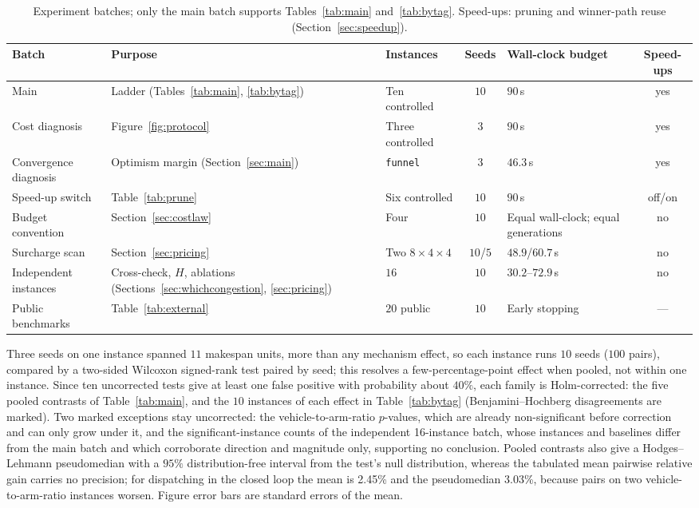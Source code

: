 \documentclass[manuscript,screen,review]{acmart}
\newcommand{\NCases}{10}
\newcommand{\NSeeds}{10}
\newcommand{\NPairs}{100}
\newcommand{\GainProbeLoop}{2.45\%}      %
\newcommand{\HLProbeLoop}{3.03\%}
\newcommand{\MatrixCells}{16}
\newcommand{\PubNInst}{20}
\begin{document}
\begin{table}[t]
\caption{Experiment batches; only the main batch supports Tables~\ref{tab:main} and~\ref{tab:bytag}. Speed-ups: pruning and winner-path reuse (Section~\ref{sec:speedup}).}
\label{tab:batches}
\footnotesize
\begin{tabular}{@{}p{1.7cm}p{2.3cm}p{1.9cm}cp{1.6cm}c@{}}
\toprule
Batch & Purpose & Instances & Seeds & Wall-clock budget & Speed-ups \\
\midrule
Main & Ladder (Tables~\ref{tab:main}, \ref{tab:bytag}) & Ten controlled & $\NSeeds$ & $90$\,s & yes \\
Cost diagnosis & Figure~\ref{fig:protocol} & Three controlled & $3$ & $90$\,s & yes \\
Convergence diagnosis & Optimism margin (Section~\ref{sec:main}) & \texttt{funnel} & $3$ & $46.3$\,s & yes \\
Speed-up switch & Table~\ref{tab:prune} & Six controlled & $10$ & $90$\,s & off/on \\
Budget convention & Section~\ref{sec:costlaw} & Four & $10$ & Equal wall-clock; equal generations & no \\
Surcharge scan & Section~\ref{sec:pricing} & Two $8\times4\times4$ & $10$/$5$ & $48.9$/$60.7$\,s & no \\
Independent instances & Cross-check, $H$, ablations (Sections~\ref{sec:whichcongestion}, \ref{sec:pricing}) & $\MatrixCells$ & $10$ & $30.2$--$72.9$\,s & no \\
Public benchmarks & Table~\ref{tab:external} & $\PubNInst$ public & $\NSeeds$ & Early stopping & --- \\
\bottomrule
\end{tabular}
\end{table}

Three seeds on one instance spanned $11$ makespan units, more than any mechanism effect, so each instance runs $\NSeeds$ seeds ($\NPairs$ pairs), compared by a two-sided Wilcoxon signed-rank test paired by seed; this resolves a few-percentage-point effect when pooled, not within one instance.
Since ten uncorrected tests give at least one false positive with probability about $40\%$, each family is Holm-corrected: the five pooled contrasts of Table~\ref{tab:main}, and the $\NCases$ instances of each effect in Table~\ref{tab:bytag} (Benjamini--Hochberg disagreements are marked).
Two marked exceptions stay uncorrected: the vehicle-to-arm-ratio $p$-values, which are already non-significant before correction and can only grow under it, and the significant-instance counts of the independent \MatrixCells{}-instance batch, whose instances and baselines differ from the main batch and which corroborate direction and magnitude only, supporting no conclusion.
Pooled contrasts also give a Hodges--Lehmann pseudomedian with a $95\%$ distribution-free interval from the test's null distribution, whereas the tabulated mean pairwise relative gain carries no precision; for dispatching in the closed loop the mean is \GainProbeLoop{} and the pseudomedian \HLProbeLoop{}, because pairs on two vehicle-to-arm-ratio instances worsen.
Figure error bars are standard errors of the mean.
\end{document}
